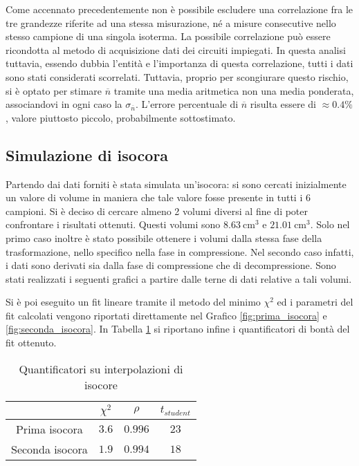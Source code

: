 \documentclass[a4paper,11pt,oneside]{article}
\begin{document}
Come accennato precedentemente non è possibile escludere una correlazione fra le tre grandezze riferite ad una stessa misurazione, né a misure consecutive nello stesso campione di una singola isoterma. La possibile correlazione può essere ricondotta al metodo di acquisizione dati dei circuiti impiegati. In questa analisi tuttavia, essendo dubbia l'entità e l'importanza di questa correlazione, tutti i dati sono stati considerati scorrelati. Tuttavia, proprio per scongiurare questo rischio, si è optato per stimare $\overline{n}$ tramite una media aritmetica non una media ponderata, associandovi in ogni caso la $\sigma_{\overline{n}}$. L'errore percentuale di $\overline{n}$ risulta essere di $\approx 0.4 \%$, valore piuttosto piccolo, probabilmente sottostimato. 

\subsection{Simulazione di isocora}
Partendo dai dati forniti è stata simulata un'isocora: si sono cercati inizialmente un valore di volume in maniera che tale valore fosse presente in tutti i 6 campioni. Si è deciso di cercare almeno 2 volumi diversi al fine di poter confrontare i risultati ottenuti. Questi volumi sono $\SI{8.63}{\centi\meter\cubed}$ e $\SI{21.01}{\centi\meter\cubed}$. Solo nel primo caso inoltre è stato possibile ottenere i volumi dalla stessa fase della trasformazione, nello specifico nella fase in compressione. Nel secondo caso infatti, i dati sono derivati sia dalla fase di compressione che di decompressione.
Sono stati realizzati i seguenti grafici a partire dalle terne di dati relative a tali volumi.
\begin{figure}[h!]
    \centering
    \label{fig:isocore}
\end{figure}

Si è poi eseguito un fit lineare tramite il metodo del minimo $\chi^2$ ed i parametri del fit calcolati vengono riportati direttamente nel Grafico \ref{fig:prima_isocora} e \ref{fig:seconda_isocora}. In Tabella \ref{tab:quantificatori_isocore} si riportano infine i quantificatori di bontà del fit ottenuto.

\begin{table}[h!]
    \centering
    \begin{tabular}{|c|c|c|c|}
        \hline
         & $\chi^2$ & $\rho$ & $t_{student}$ \\ \hline
        \rowcolor[rgb]{0.85,0.85,0.85} Prima isocora & $3.6$ & $0.996$ & $23$ \\ \hline
        Seconda isocora & $1.9$ & $0.994$ & $18$ \\ \hline
    \end{tabular}
    \caption{Quantificatori su interpolazioni di isocore}
    \label{tab:quantificatori_isocore}
\end{table}
\end{document}
